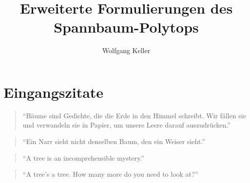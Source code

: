 \documentclass[10p,a4paper,BCOR = 12mm, DIV=15]{scrbook}
\author{Wolfgang Keller}
\title{Erweiterte Formulierungen des Spannbaum-Polytops}
\begin{document}
\newtheorem{Def}{Definition}
\newtheorem{Le}[Def]{Lemma}
\newtheorem{Sa}[Def]{Satz}
\newtheorem{Kor}[Def]{Korollar}
\newtheorem{Prop}[Def]{Proposition}
\newtheorem{Pro}[Def]{Problem}
\newtheorem{Bem}[Def]{Bemerkung}
\newtheorem{Bsp}[Def]{Beispiel}
\newtheorem{BspDef}[Def]{Beispiel/Definition}
\newtheorem{Ver}[Def]{Vermutung}

\newcommand{\rec}{\operatorname{rec}}
\newcommand{\cone}{\operatorname{cone}}
\newcommand{\conv}{\operatorname{conv}}
\newcommand{\bild}{\operatorname{bild}}
\newcommand{\rg}{\operatorname{rg}}
\newcommand{\proj}{\operatorname{proj}}
\newcommand{\vertices}{\operatorname{vert}}
\newcommand{\aff}{\operatorname{aff}}
\newcommand{\sgn}{\operatorname{sgn}}
\newcommand{\trace}{\operatorname{tr}}

\newenvironment{bew}{\begin{proof}[Beweis]}{\end{proof}}



\maketitle

\tableofcontents

\chapter*{Eingangszitate}

\begin{quote}
"`Bäume sind Gedichte, die die Erde in den Himmel schreibt. Wir fällen sie und verwandeln sie in Papier, um unsere Leere darauf auszudrücken."' \\
\end{quote}

\begin{quote}
"`Ein Narr sieht nicht denselben Baum, den ein Weiser sieht."' \\
\end{quote}

\begin{quote}
"`A tree is an incomprehensible mystery."' \\
\end{quote}

\begin{quote}
"`A tree's a tree. How many more do you need to look at?"' \\
\end{quote}
\end{document}
